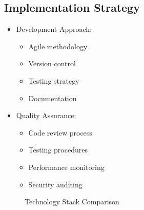 \subsection{Implementation Strategy}
\begin{itemize}
    \item Development Approach:
    \begin{itemize}
        \item Agile methodology
        \item Version control
        \item Testing strategy
        \item Documentation
    \end{itemize}
    \item Quality Assurance:
    \begin{itemize}
        \item Code review process
        \item Testing procedures
        \item Performance monitoring
        \item Security auditing
    \end{itemize}
\end{itemize}

\begin{figure}[h]
    \centering
    \caption{Technology Stack Comparison}
    \label{fig:technology-comparison}
\end{figure} 
